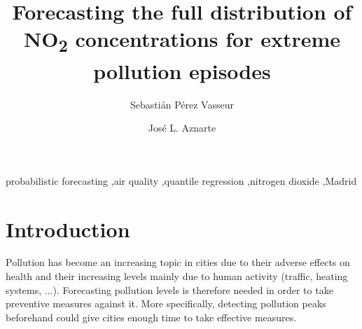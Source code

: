 \documentclass[a4paper,twocolumn,5p]{elsarticle}
\begin{document}
\newcommand{\no}{NO\textsubscript{2}\xspace}

\begin{frontmatter}

  \title{Forecasting the full distribution of \no concentrations for
    extreme pollution episodes}

\author{Sebasti\'an P\'erez Vasseur} 
\address{Artificial Intelligence Department\\Universidad Nacional de
  Educaci\'on a Distancia --- UNED\\c/ Juan del Rosal, 16, Madrid, Spain}

\author{Jos\'e L. Aznarte}
\address{Artificial Intelligence Department\\Universidad Nacional de
  Educaci\'on a Distancia --- UNED\\c/ Juan del Rosal, 16, Madrid, Spain}



\begin{abstract}
\end{abstract}

\begin{keyword}
probabilistic forecasting \sep air quality \sep quantile regression
\sep nitrogen dioxide \sep Madrid
\end{keyword}

\end{frontmatter}


\section{Introduction}
\label{sec:intro}


Pollution has become an increasing topic in cities due to their
adverse effects on health and their increasing levels mainly due to
human activity (traffic, heating systems, ...). Forecasting pollution
levels is therefore needed in order to take preventive measures
against it. More specifically, detecting pollution peaks beforehand
could give cities enough time to take effective measures.
\end{document}
